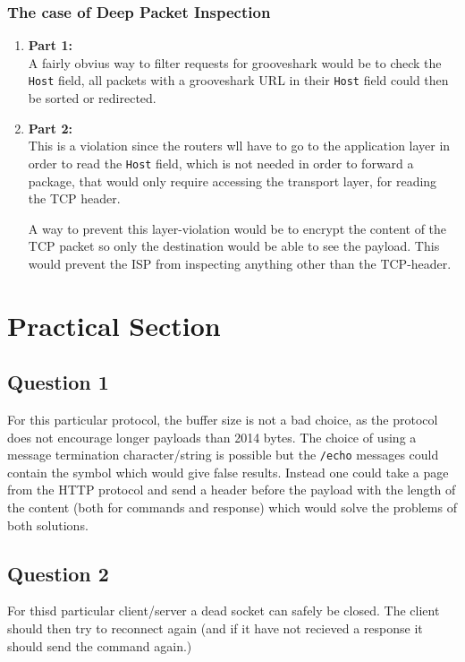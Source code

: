 \documentclass[10pt]{article}
\begin{document}
\subsubsection{The case of Deep Packet Inspection}
\begin{enumerate}
    \item \textbf{Part 1:}\\
    A fairly obvius way to filter requests for grooveshark would be to check the
    \texttt{Host} field, all packets with a grooveshark URL in their
    \texttt{Host} field could then be sorted or redirected.

    \item \textbf{Part 2:}\\
    This is a violation since the routers wll have to go to the application
    layer in order to read the \texttt{Host} field, which is not needed in order
    to forward a package, that would only require accessing the transport layer,
    for reading the TCP header.

    A way to prevent this layer-violation would be to encrypt the content of the
    TCP packet so only the destination would be able to see the payload. This
    would prevent the ISP from inspecting anything other than the TCP-header.

\end{enumerate}


\section{Practical Section}

\subsection{Question 1}
For this particular protocol, the buffer size is not a bad choice, as the
protocol does not encourage longer payloads than 2014 bytes. The choice of using
a message termination character/string is possible but the \texttt{/echo}
messages could contain the symbol which would give false results. Instead one
could take a page from the HTTP protocol and send a header before the payload
with the length of the content (both for commands and response) which would
solve the problems of both solutions.

\subsection{Question 2}
For thisd particular client/server a dead socket can safely be closed. The
client should then try to reconnect again (and if it have not recieved a
response it should send the command again.)
\end{document}
